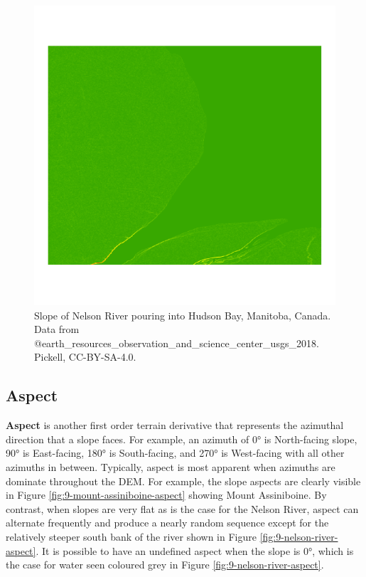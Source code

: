 \documentclass[
]{book}
\begin{document}
\begin{figure}
\includegraphics[width=0.75\linewidth]{images/09-nelson-river-slope} \caption{Slope of Nelson River pouring into Hudson Bay, Manitoba, Canada. Data from @earth_resources_observation_and_science_center_usgs_2018. Pickell, CC-BY-SA-4.0.}\label{fig:9-nelson-river-slope}
\end{figure}

\subsection{Aspect}\label{aspect}

\textbf{Aspect} is another first order terrain derivative that represents the azimuthal direction that a slope faces. For example, an azimuth of 0° is North-facing slope, 90° is East-facing, 180° is South-facing, and 270° is West-facing with all other azimuths in between. Typically, aspect is most apparent when azimuths are dominate throughout the DEM. For example, the slope aspects are clearly visible in Figure \ref{fig:9-mount-assiniboine-aspect} showing Mount Assiniboine. By contrast, when slopes are very flat as is the case for the Nelson River, aspect can alternate frequently and produce a nearly random sequence except for the relatively steeper south bank of the river shown in Figure \ref{fig:9-nelson-river-aspect}. It is possible to have an undefined aspect when the slope is 0°, which is the case for water seen coloured grey in Figure \ref{fig:9-nelson-river-aspect}.
\end{document}
